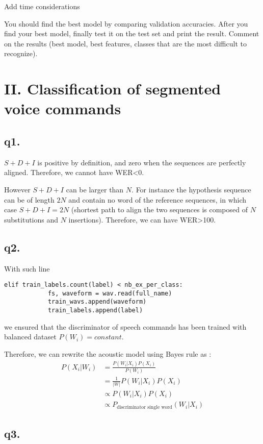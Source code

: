 \documentclass[11pt]{article}
\begin{document}
Add time considerations


You should find the best model by comparing validation accuracies. After you find your best model, finally test it on the test set and print the result. Comment on the results (best model, best features, classes that are the most difficult to recognize).

\section{II. Classification of segmented voice commands}

\subsection{q1.}
$S+D+I$ is positive by definition, and zero when the sequences are perfectly aligned. Therefore, we cannot have WER<0.

However $S+D+I$ can be larger than $N$. For instance the hypothesis sequence can be of length $2N$ and contain no word of the reference sequences, in which case $S+D+I=2N$ (shortest path to align the two sequences is composed of $N$ substitutions and $N$ insertions).
Therefore, we can have WER>100.

\subsection{q2.}

With such line 

\begin{lstlisting}
elif train_labels.count(label) < nb_ex_per_class:
            fs, waveform = wav.read(full_name)
            train_wavs.append(waveform)
            train_labels.append(label)
\end{lstlisting}            

we ensured that the discriminator of speech commands has been trained with balanced dataset $P(W_i) = constant$.

Therefore, we can rewrite the acoustic model using Bayes rule as :
 \begin{align*}
 P(X_i|W_i) &= \frac{P(W_i|X_i)P(X_i)}{P(W_i)} \\
 & =  \frac{1}{|W|} P(W_i|X_i)P(X_i) \\
 &  \propto P(W_i|X_i)P(X_i) \\
 & \propto P_{\text{discriminator single word}}(W_i|X_i) 
 \end{align*} 
 
 \subsection{q3.}
 
\end{document}
